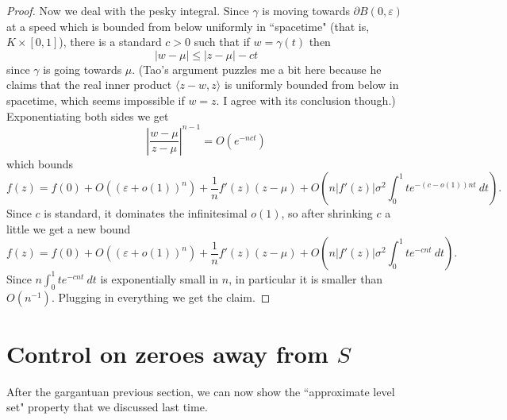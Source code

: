 \documentclass[12pt]{article}
\begin{document}
\begin{proof}
Now we deal with the pesky integral.
Since $\gamma$ is moving towards $\partial B(0, \varepsilon)$ at a speed which is bounded from below uniformly in ``spacetime" (that is, $K \times [0, 1]$), there is a standard $c > 0$ such that if $w = \gamma(t)$ then
$$|w - \mu| \leq |z - \mu| - ct$$
since $\gamma$ is going towards $\mu$.
(Tao's argument puzzles me a bit here because he claims that the real inner product $\langle z - w, z\rangle$ is uniformly bounded from below in spacetime, which seems impossible if $w = z$. I agree with its conclusion though.)
Exponentiating both sides we get
$$\left|\frac{w - \mu}{z - \mu}\right|^{n-1} = O(e^{-nct})$$
which bounds
$$f(z) = f(0) + O((\varepsilon + o(1))^n) + \frac{1}{n} f'(z) (z - \mu) + O\left(n|f'(z)|\sigma^2 \int_0^1 te^{-(c-o(1))nt} ~dt\right).$$
Since $c$ is standard, it dominates the infinitesimal $o(1)$, so after shrinking $c$ a little we get a new bound
$$f(z) = f(0) + O((\varepsilon + o(1))^n) + \frac{1}{n} f'(z) (z - \mu) + O\left(n|f'(z)|\sigma^2 \int_0^1 te^{-cnt} ~dt\right).$$
Since $n\int_0^1 te^{-cnt} ~dt$ is exponentially small in $n$, in particular it is smaller than $O(n^{-1})$.
Plugging in everything we get the claim.
\end{proof}

\section{Control on zeroes away from $S$}
After the gargantuan previous section, we can now show the ``approximate level set" property that we discussed last time.
\end{document}
